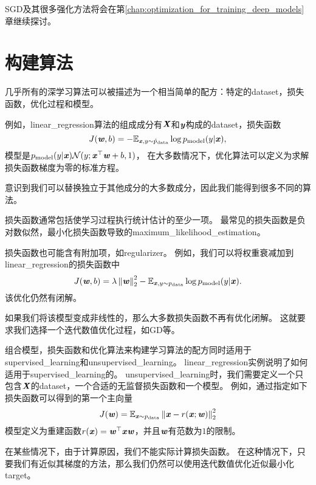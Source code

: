 \gls{SGD}及其很多强化方法将会在第\ref{chap:optimization_for_training_deep_models}章继续探讨。

\section{构建算法}
\label{sec:building_a_machine_learning_algorithm}
几乎所有的深学习算法可以被描述为一个相当简单的配方：特定的\gls{dataset}，损失函数，优化过程和模型。

例如，\gls{linear_regression}算法的组成成分有$\boldsymbol{\mathit{X}}$和$\boldsymbol{\mathit{y}}$构成的\gls{dataset}，损失函数
\begin{equation}
    J(\boldsymbol{\mathit{w}}, b) = -\mathbb{E}_{\boldsymbol{\mathit{x}},y\sim\hat{p}_{\text{data}}}
    \log p_{\text{model}} (y | \boldsymbol{\mathit{x}}) ,
\end{equation}
模型是$p_{\text{model}} (y | \boldsymbol{\mathit{x}}) \mathcal{N}(y; \boldsymbol{\mathit{x}}^\top \boldsymbol{\mathit{w}} + b, 1)$，
在大多数情况下，优化算法可以定义为求解损失函数梯度为零的标准方程。

意识到我们可以替换独立于其他成分的大多数成分，因此我们能得到很多不同的算法。


损失函数通常包括使学习过程执行统计估计的至少一项。
最常见的损失函数是负对数似然，最小化损失函数导致的\gls{maximum_likelihood_estimation}。

损失函数也可能含有附加项，如\gls{regularizer}。
例如，我们可以将权重衰减加到\gls{linear_regression}的损失函数中
\begin{equation}
    J(\boldsymbol{\mathit{w}}, b) = \lambda \left\lVert\boldsymbol{\mathit{w}}\right\rVert_2^2 - \mathbb{E}_{\boldsymbol{\mathit{x}},y\sim p_{\text{data}}}
    \log p_{\text{model}} (y | \boldsymbol{\mathit{x}}) .
\end{equation}
该优化仍然有闭解。

如果我们将该模型变成非线性的，那么大多数损失函数不再有优化闭解。
这就要求我们选择一个迭代数值优化过程，如\gls{GD}等。

组合模型，损失函数和优化算法来构建学习算法的配方同时适用于\gls{supervised_learning}和\gls{unsupervised_learning}。
\gls{linear_regression}实例说明了如何适用于\gls{supervised_learning}的。
\gls{unsupervised_learning}时，我们需要定义一个只包含$\boldsymbol{\mathit{X}}$的\gls{dataset}，一个合适的无监督损失函数和一个模型。
例如，通过指定如下损失函数可以得到的第一个主向量
\begin{equation}
    J(\boldsymbol{\mathit{w}}) = \mathbb{E}_{\boldsymbol{\mathit{x}} \sim p_{\text{data}}} \left\lVert\boldsymbol{\mathit{x}} - r(\boldsymbol{\mathit{x}}; \boldsymbol{\mathit{w}})\right\rVert_2^2
\end{equation}
模型定义为重建函数$r(\boldsymbol{\mathit{x}}) = \boldsymbol{\mathit{w}}^\top\boldsymbol{\mathit{x}} \boldsymbol{\mathit{w}}$，并且$\boldsymbol{\mathit{w}}$有范数为$1$的限制。

在某些情况下，由于计算原因，我们不能实际计算损失函数。
在这种情况下，只要我们有近似其梯度的方法，那么我们仍然可以使用迭代数值优化近似最小化\gls{target}。

